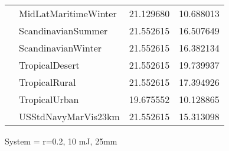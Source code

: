 \begin{tabular}{llrr}
             & MidLatMaritimeWinter &  21.129680 &  10.688013 \\
             & ScandinavianSummer &  21.552615 &  16.507649 \\
             & ScandinavianWinter &  21.552615 &  16.382134 \\
             & TropicalDesert &  21.552615 &  19.739937 \\
             & TropicalRural &  21.552615 &  17.394926 \\
             & TropicalUrban &  19.675552 &  10.128865 \\
             & USStdNavyMarVis23km &  21.552615 &  15.313098 \\
\bottomrule
\end{tabular}


\clearpage
System =  r=0.2, 10 mJ, 25mm

